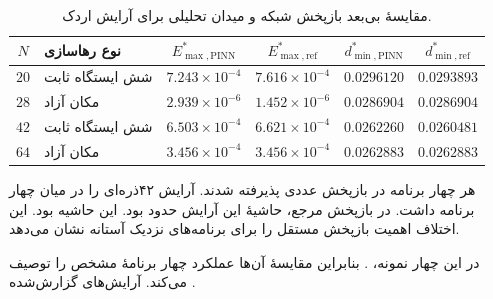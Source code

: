 \begin{table}[htbp]
\centering
\small
\setlength{\tabcolsep}{5pt}
\caption{مقایسهٔ بی‌بعد بازپخش شبکه و میدان تحلیلی برای آرایش اردک.}
\label{tab:results-formation-ducks}
\begin{tabular}{@{}clcccc@{}}
\hline
$N$ & نوع رهاسازی & $E_{\max,\mathrm{PINN}}^*$ & $E_{\max,\mathrm{ref}}^*$
& $d_{\min,\mathrm{PINN}}^*$ & $d_{\min,\mathrm{ref}}^*$ \\
\hline
$20$ & شش ایستگاه ثابت & $7.243\times10^{-4}$ & $7.616\times10^{-4}$ & $0.0296120$ & $0.0293893$ \\
$28$ & مکان آزاد & $2.939\times10^{-6}$ & $1.452\times10^{-6}$ & $0.0286904$ & $0.0286904$ \\
$42$ & شش ایستگاه ثابت & $6.503\times10^{-4}$ & $6.621\times10^{-4}$ & $0.0262260$ & $0.0260481$ \\
$64$ & مکان آزاد & $3.456\times10^{-4}$ & $3.456\times10^{-4}$ & $0.0262883$ & $0.0262883$ \\
\hline
\end{tabular}
\end{table}

هر چهار برنامه در بازپخش عددی پذیرفته شدند.
آرایش ۴۲ذره‌ای  را در میان چهار برنامه داشت.
در بازپخش مرجع، حاشیهٔ این آرایش حدود  بود.
این حاشیه  بود.
این اختلاف اهمیت بازپخش مستقل را برای برنامه‌های نزدیک آستانه نشان می‌دهد.

\enlargethispage{2\baselineskip}
در این چهار نمونه، .
بنابراین مقایسهٔ آن‌ها عملکرد چهار برنامهٔ مشخص را توصیف می‌کند.
آرایش‌های گزارش‌شده .

